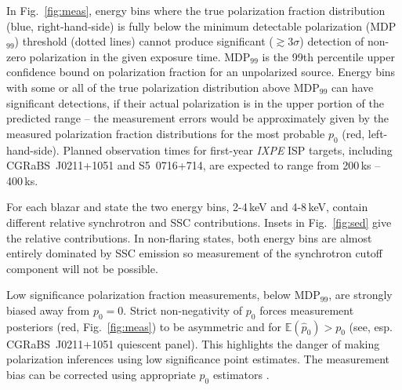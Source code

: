 In Fig.~\ref{fig:meas}, energy bins where the true polarization fraction distribution (blue, right-hand-side) is fully below the minimum detectable polarization (MDP$_{99}$) threshold (dotted lines) cannot produce significant ($\gtrsim 3\sigma$) detection of non-zero polarization in the given exposure time. MDP$_{99}$ is the 99th percentile upper confidence bound on polarization fraction for an unpolarized source. Energy bins with some or all of the true polarization distribution above MDP$_{99}$ can have significant detections, if their actual polarization is in the upper portion of the predicted range -- the measurement errors would be approximately given by the measured polarization fraction distributions for the most probable $p_0$ (red, left-hand-side). Planned observation times for first-year {\it IXPE} ISP targets, including CGRaBS~J0211+1051 and S5~0716+714, are expected to range from 200\,ks -- 400\,ks.  

For each blazar and state the two energy bins, 2-4\,keV and 4-8\,keV, contain different relative synchrotron and SSC contributions. Insets in Fig.~\ref{fig:sed} give the relative contributions. In non-flaring states, both energy bins are almost entirely dominated by SSC emission so measurement of the synchrotron cutoff component will not be possible.

Low significance polarization fraction measurements, below MDP$_{99}$, are strongly biased away from $p_0 = 0$. Strict non-negativity of $p_0$ forces measurement posteriors (red, Fig.~\ref{fig:meas}) to be asymmetric and for $\mathbb{E}(\hat{p}_0) > p_0$ (see, esp. CGRaBS~J0211+1051 quiescent panel). This highlights the danger of making polarization inferences using low significance point estimates. The measurement bias can be corrected using appropriate $p_0$ estimators \citep{simmons_point_1985}. 

